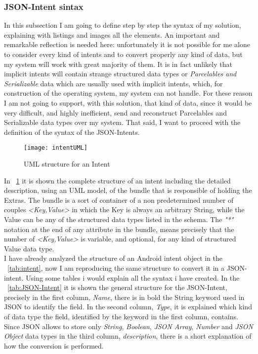 \subsubsection{JSON-Intent sintax}\label{syntax}
In this subsection I am going to define step by step the syntax of my solution, explaining with listings and images all the elements.
An important and remarkable reflection is needed here: unfortunately it is not possible for me alone to consider every kind of intents and to convert properly any kind of data, but my system will work with great majority of them. It is in fact unlikely that implicit intents will contain strange structured data types or \textit{Parcelables and Serializable} data which are usually used with implicit intents, which, for construction of the operating system, my system can not handle. For these reason I am not going to support, with this solution, that kind of data, since it would be very difficult, and highly inefficient, send and reconstruct Parcelables and Serializable data types over my system. That said, I want to proceed with the definition of the syntax of the JSON-Intents.\\
\begin{figure}[h]
	\centering
	\texttt{[image: intentUML]}
	\caption{UML  structure for an Intent}
	\label{fig:4.4}
\end{figure}
In \figurename~\ref{fig:4.4} it is shown the complete structure of an intent including the detailed description, using an UML model, of the bundle that is responsible of holding the Extras. The bundle is a sort of container of a non predetermined number of couples \textit{<Key,Value>} in which the Key is always an arbitrary String, while the Value can be any of the structured data types listed in the schema.
The \textit{"*"} notation at the end of any attribute in the bundle, means precisely that the number of \textit{<Key,Value>} is variable, and optional, for any kind of structured Value data type.\\
I have already analyzed the structure of an Android intent object in the \tablename~\ref{tab:intent}, now I am reproducing the same structure to convert it in a JSON-intent. Using some tables i would explain all the syntax i have created. In the \tablename~\ref{tab:JSON-Intent} it is shown the general structure for the JSON-Intent, precisely in the first column, \textit{Name}, there is in bold the String keyword used in JSON to identify the field. In the second column, \textit{Type}, it is explained which kind of data type the field, identified by the keyword in the first column, contains. Since JSON allows to store only \textit{String},	\textit{Boolean}, \textit{JSON Array}, \textit{Number} and \textit{JSON Object} data types in the third column, \textit{description}, there is a short explanation of how the conversion is performed.
